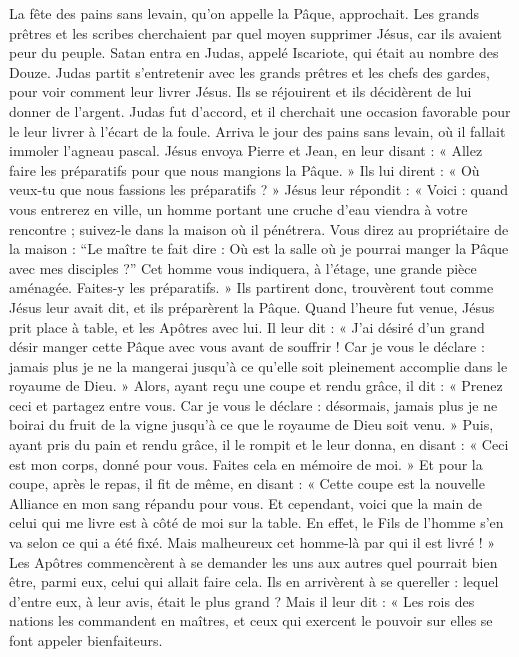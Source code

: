 La fête des pains sans levain, qu’on appelle la Pâque, approchait.
 Les grands prêtres et les scribes cherchaient par quel moyen supprimer Jésus, car ils avaient peur du peuple.
 Satan entra en Judas, appelé Iscariote, qui était au nombre des Douze.
 Judas partit s’entretenir avec les grands prêtres et les chefs des gardes, pour voir comment leur livrer Jésus.
 Ils se réjouirent et ils décidèrent de lui donner de l’argent.
 Judas fut d’accord, et il cherchait une occasion favorable pour le leur livrer à l’écart de la foule.
 Arriva le jour des pains sans levain, où il fallait immoler l’agneau pascal.
 Jésus envoya Pierre et Jean, en leur disant : « Allez faire les préparatifs pour que nous mangions la Pâque. »
 Ils lui dirent : « Où veux-tu que nous fassions les préparatifs ? »
 Jésus leur répondit : « Voici : quand vous entrerez en ville, un homme portant une cruche d’eau viendra à votre rencontre ; suivez-le dans la maison où il pénétrera.
 Vous direz au propriétaire de la maison : “Le maître te fait dire : Où est la salle où je pourrai manger la Pâque avec mes disciples ?”
 Cet homme vous indiquera, à l’étage, une grande pièce aménagée. Faites-y les préparatifs. »
 Ils partirent donc, trouvèrent tout comme Jésus leur avait dit, et ils préparèrent la Pâque.
 Quand l’heure fut venue, Jésus prit place à table, et les Apôtres avec lui.
 Il leur dit : « J’ai désiré d’un grand désir manger cette Pâque avec vous avant de souffrir !
 Car je vous le déclare : jamais plus je ne la mangerai jusqu’à ce qu’elle soit pleinement accomplie dans le royaume de Dieu. »
 Alors, ayant reçu une coupe et rendu grâce, il dit : « Prenez ceci et partagez entre vous.
 Car je vous le déclare : désormais, jamais plus je ne boirai du fruit de la vigne jusqu’à ce que le royaume de Dieu soit venu. »
 Puis, ayant pris du pain et rendu grâce, il le rompit et le leur donna, en disant : « Ceci est mon corps, donné pour vous. Faites cela en mémoire de moi. »
 Et pour la coupe, après le repas, il fit de même, en disant : « Cette coupe est la nouvelle Alliance en mon sang répandu pour vous.
 Et cependant, voici que la main de celui qui me livre est à côté de moi sur la table.
 En effet, le Fils de l’homme s’en va selon ce qui a été fixé. Mais malheureux cet homme-là par qui il est livré ! »
 Les Apôtres commencèrent à se demander les uns aux autres quel pourrait bien être, parmi eux, celui qui allait faire cela.
 Ils en arrivèrent à se quereller : lequel d’entre eux, à leur avis, était le plus grand ?
 Mais il leur dit : « Les rois des nations les commandent en maîtres, et ceux qui exercent le pouvoir sur elles se font appeler bienfaiteurs.
